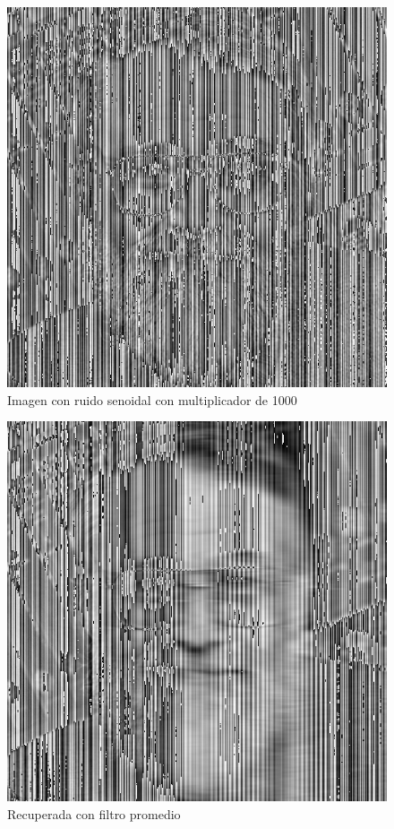 \begin{figure}[H]
\begin {center}
\includegraphics[width=360pt]{imagenes/kern-sin1000-noisy.png}
\end {center}
\caption{Imagen con ruido senoidal con multiplicador de 1000}
\label{fig:SinProm}
\end{figure}

\begin{figure}[H]
\begin {center}
\includegraphics[width=360pt]{imagenes/kern-sin1000-recovered-avg.png}
\end {center}
\caption{Recuperada con filtro promedio}
\label{fig:SinProm}
\end{figure}

